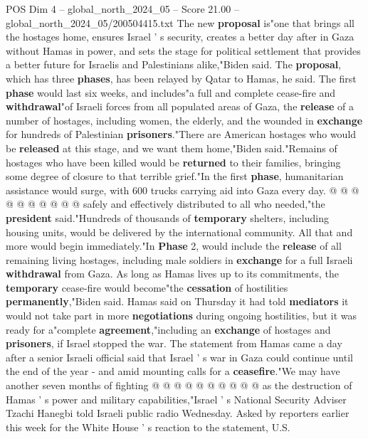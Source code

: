 \begin{textsample}{POS Dim 4 – global\_north\_2024\_05 – Score 21.00 – global\_north\_2024\_05/200504415.txt}  \label{ex:f4_pos_337}
The new \textbf{proposal} is"one that brings all the hostages home, ensures Israel ' s security, creates a better day after in Gaza without Hamas in power, and sets the stage for political settlement that provides a better future for Israelis and Palestinians alike,"Biden said.
The \textbf{proposal}, which has three \textbf{phases}, has been relayed by Qatar to Hamas, he said.
The first \textbf{phase} would last six weeks, and includes"a full and complete cease-fire and \textbf{withdrawal}"of Israeli forces from all populated areas of Gaza, the \textbf{release} of a number of hostages, including women, the elderly, and the wounded in \textbf{exchange} for hundreds of Palestinian \textbf{prisoners}."There are American hostages who would be \textbf{released} at this stage, and we want them home,"Biden said."Remains of hostages who have been killed would be \textbf{returned} to their families, bringing some degree of closure to that terrible grief."In the first \textbf{phase}, humanitarian assistance would surge, with 600 trucks carrying aid into Gaza every day. @ @ @ @ @ @ @ @ @ @ safely and effectively distributed to all who needed,"the \textbf{president} said."Hundreds of thousands of \textbf{temporary} shelters, including housing units, would be delivered by the international community.
All that and more would begin immediately."In \textbf{Phase} 2, would include the \textbf{release} of all remaining living hostages, including male soldiers in \textbf{exchange} for a full Israeli \textbf{withdrawal} from Gaza.
As long as Hamas lives up to its commitments, the \textbf{temporary} cease-fire would become"the \textbf{cessation} of hostilities \textbf{permanently},"Biden said.
Hamas said on Thursday it had told \textbf{mediators} it would not take part in more \textbf{negotiations} during ongoing hostilities, but it was ready for a"complete \textbf{agreement},"including an \textbf{exchange} of hostages and \textbf{prisoners}, if Israel stopped the war.
The statement from Hamas came a day after a senior Israeli official said that Israel ' s war in Gaza could continue until the end of the year - and amid mounting calls for a \textbf{ceasefire}."We may have another seven months of fighting @ @ @ @ @ @ @ @ @ @ as the destruction of Hamas ' s power and military capabilities,"Israel ' s National Security Adviser Tzachi Hanegbi told Israeli public radio Wednesday.
Asked by reporters earlier this week for the White House ' s reaction to the statement, U.S.

\end{textsample}
